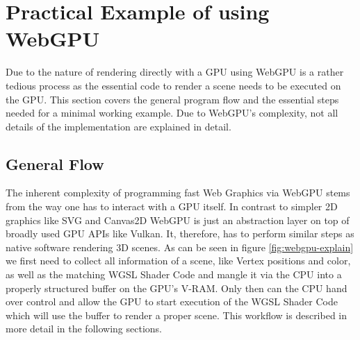 %
%
% 
% 

\newcommand*{\codesnippet}[4]{
  \inputminted[
    frame=lines,
    framesep=2mm,
    baselinestretch=1.2,
    linenos,
    fontsize=\scriptsize,
    firstline=#1,
    lastline=#2
  ]{#3}{#4}}


\newcommand*{\code}[1]{
  \inputminted[
    frame=lines,
    framesep=2mm,
    baselinestretch=1.2,
    linenos,
    fontsize=\scriptsize,
    breaklines=true,
    highlightlines={30-33,42-49}
  ]{typescript}{#1}}


\chapter{Practical Example of using WebGPU}

\label{chap:PracticalExample}

Due to the nature of rendering directly with a GPU using WebGPU is a rather tedious process as the essential code to render a scene needs to be executed on the GPU.
This section covers the general program flow and the essential steps needed for a minimal working example. Due to WebGPU's complexity, not all details of the implementation are explained in detail. 


\section{General Flow}

The inherent complexity of programming fast Web Graphics via WebGPU stems from the way one has to interact with a GPU itself.
In contrast to simpler 2D graphics like SVG and Canvas2D WebGPU is just an abstraction layer on top of broadly used GPU APIs like Vulkan.
It, therefore, has to perform similar steps as native software rendering 3D scenes. As can be seen in figure \ref*{fig:webgpu-explain} we first need to
collect all information of a scene, like Vertex positions and color, as well as the matching WGSL Shader Code and mangle it via the CPU into a properly structured
buffer on the GPU's V-RAM. Only then can the CPU hand over control and allow the GPU to start execution of the WGSL Shader Code which will use the buffer to render a proper scene.
This workflow is described in more detail in the following sections.


